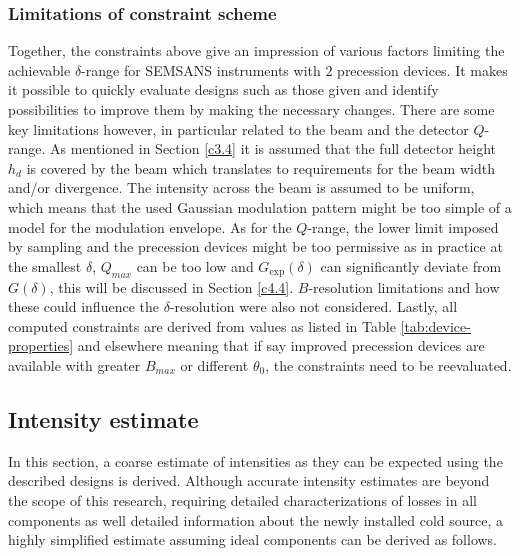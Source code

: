 \documentclass{article}
\begin{document}
\subsubsection{Limitations of constraint scheme}
Together, the constraints above give an impression of various factors limiting the achievable $\delta$-range for SEMSANS instruments with $2$ precession devices. It makes it possible to quickly evaluate designs such as those given and identify possibilities to improve them by making the necessary changes. There are some key limitations however, in particular related to the beam and the detector $Q$-range. As mentioned in Section \ref{c3.4} it is assumed that the full detector height $h_d$ is covered by the beam which translates to requirements for the beam width and/or divergence. The intensity across the beam is assumed to be uniform, which means that the used Gaussian modulation pattern might be too simple of a model for the modulation envelope. As for the $Q$-range, the lower limit imposed by sampling and the precession devices might be too permissive as in practice at the smallest $\delta$, $Q_{max}$ can be too low and $G_\text{exp}(\delta)$ can significantly deviate from $G(\delta)$, this will be discussed in Section \ref{c4.4}. $B$-resolution limitations and how these could influence the $\delta$-resolution were also not considered. Lastly, all computed constraints are derived from values as listed in Table \ref{tab:device-properties} and elsewhere meaning that if say improved precession devices are available with greater $B_{max}$ or different $\theta_0$, the constraints need to be reevaluated.  

 




\subsection{Intensity estimate}
\label{c4.3}
In this section, a coarse estimate of intensities as they can be expected using the described designs is derived. Although accurate intensity estimates are beyond the scope of this research, requiring detailed characterizations of losses in all components as well detailed information about the newly installed cold source, a highly simplified estimate assuming ideal components can be derived as follows.
\end{document}
